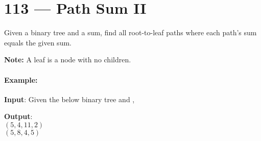 \section{113 --- Path Sum II}
Given a binary tree and a sum, find all root-to-leaf paths where each path's sum equals the given sum.

\textbf{Note:} A leaf is a node with no children.

\paragraph{Example:}
 
\begin{flushleft}
\textbf{Input}: Given the below binary tree and ,

\begin{figure}[H]
\end{figure}
\textbf{Output}:
\\
$(5,4,11,2)$
\\
$(5,8,4,5)$
\end{flushleft}
